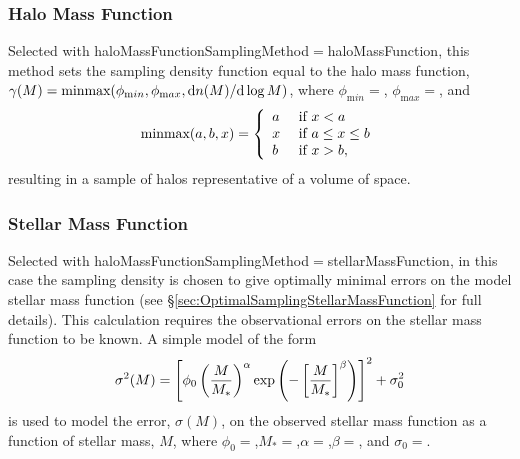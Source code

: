 \subsubsection{Halo Mass Function}

Selected with {\normalfont \ttfamily haloMassFunctionSamplingMethod}$=${\normalfont \ttfamily haloMassFunction}, this method sets the sampling density function equal to the halo mass function, $\gamma(M) = \hbox{minmax}(\phi_{\mathrm min},\phi_{\mathrm max},{\mathrm d} n(M)/{\mathrm d}\log M)$, where $\phi_{\mathrm min}=${\normalfont \ttfamily [haloMassFunctionSamplingAbundanceMinimum]}, $\phi_{\mathrm max}=${\normalfont \ttfamily [haloMassFunctionSamplingAbundanceMaximum]}, and
\begin{equation}
 \hbox{minmax}(a,b,x) = \left\{\begin{array}{ll}a & \hbox{ if } x < a \\ x & \hbox{ if } a \leq x \leq b\\ b & \hbox{ if } x > b,\end{array}\right.
\end{equation}
resulting in a sample of halos representative of a volume of space.

\subsubsection{Stellar Mass Function}

Selected with {\normalfont \ttfamily haloMassFunctionSamplingMethod}$=${\normalfont \ttfamily stellarMassFunction}, in this case the sampling density is chosen to give optimally minimal errors on the model stellar mass function (see \S\ref{sec:OptimalSamplingStellarMassFunction} for full details). This calculation requires the observational errors on the stellar mass function to be known. A simple model of the form
\begin{equation}
 \sigma^2(M) = \left[\phi_0 \left({M\over M_*}\right)^\alpha \exp\left(-\left[{M\over M_*}\right]^\beta\right)\right]^2 + \sigma_0^2
\end{equation}
is used to model the error, $\sigma(M)$, on the observed stellar mass function as a function of stellar mass, $M$, where $\phi_0=${\normalfont \ttfamily [haloMassFunctionSamplingStellarMassFunctionErrorPhi0]},$M_*=${\normalfont \ttfamily [haloMassFunctionSamplingStellarMassFunctionErrorMstar]},$\alpha=${\normalfont \ttfamily [haloMassFunctionSamplingStellarMassFunctionErrorAlpha]},$\beta=${\normalfont \ttfamily [haloMassFunctionSamplingStellarMassFunctionErrorBeta]}, and $\sigma_0=${\normalfont \ttfamily [haloMassFunctionSamplingStellarMassFunctionErrorConstant]}.

